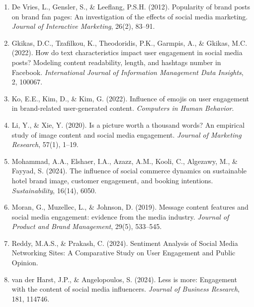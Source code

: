 \documentclass[12pt,a4paper,fontset=none]{ctexart}
\begin{document}
\begin{enumerate}
    \item De Vries, L., Gensler, S., \& Leeflang, P.S.H. (2012). Popularity of brand posts on brand fan pages: An investigation of the effects of social media marketing. \textit{Journal of Interactive Marketing}, 26(2), 83--91.

    \item Gkikas, D.C., Tzafilkou, K., Theodoridis, P.K., Garmpis, A., \& Gkikas, M.C. (2022). How do text characteristics impact user engagement in social media posts? Modeling content readability, length, and hashtags number in Facebook. \textit{International Journal of Information Management Data Insights}, 2, 100067.

    \item Ko, E.E., Kim, D., \& Kim, G. (2022). Influence of emojis on user engagement in brand-related user-generated content. \textit{Computers in Human Behavior}.

    \item Li, Y., \& Xie, Y. (2020). Is a picture worth a thousand words? An empirical study of image content and social media engagement. \textit{Journal of Marketing Research}, 57(1), 1--19.

    \item Mohammad, A.A., Elshaer, I.A., Azazz, A.M., Kooli, C., Algezawy, M., \& Fayyad, S. (2024). The influence of social commerce dynamics on sustainable hotel brand image, customer engagement, and booking intentions. \textit{Sustainability}, 16(14), 6050.

    \item Moran, G., Muzellec, L., \& Johnson, D. (2019). Message content features and social media engagement: evidence from the media industry. \textit{Journal of Product and Brand Management}, 29(5), 533--545.

    \item Reddy, M.A.S., \& Prakash, C. (2024). Sentiment Analysis of Social Media Networking Sites: A Comparative Study on User Engagement and Public Opinion.

    \item van der Harst, J.P., \& Angelopoulos, S. (2024). Less is more: Engagement with the content of social media influencers. \textit{Journal of Business Research}, 181, 114746.
\end{enumerate}
\end{document}
